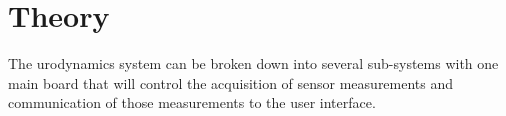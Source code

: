 \section{Theory}

The urodynamics system can be broken down into several sub-systems with one main board that will control the acquisition of sensor measurements and communication of those measurements to the user interface. 










\clearpage